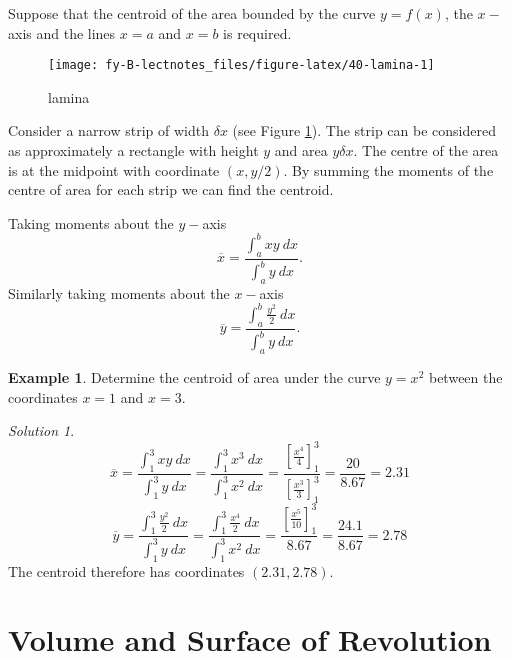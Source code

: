 \documentclass[
  11pt,
  oneside]{book}
\newcommand{\slide}{}
\theoremstyle{definition}
\theoremstyle{definition}
\newtheorem{example}{Example}[chapter]
\theoremstyle{definition}
\theoremstyle{definition}
\theoremstyle{remark}
\newtheorem*{solution}{Solution}
\begin{document}
\slide

Suppose that the centroid of the area bounded by the curve \(y=f(x)\), the \(x-\)axis and the lines \(x=a\) and \(x=b\) is required.

\begin{figure}

{\centering \texttt{[image: fy-B-lectnotes\_files/figure-latex/40-lamina-1]} 

}

\caption{lamina}\label{fig:40-lamina}
\end{figure}

Consider a narrow strip of width \(\delta x\) (see Figure \ref{fig:40-lamina}). The strip can be considered as approximately a rectangle with height \(y\) and area \(y\delta x\). The centre of the area is at the midpoint with coordinate \((x,y/2)\). By summing the moments of the centre of area for each strip we can find the centroid.

\slide

Taking moments about the \(y-\)axis
\[
\overline x = \frac{\displaystyle\int_a^bxy\ dx}{\displaystyle\int_a^b y\ dx}.
\]
Similarly taking moments about the \(x-\)axis
\[
\overline y = \frac{\displaystyle\int_a^b \frac{y^2}2\ dx}{\displaystyle\int_a^b y\ dx}.
\]
\slide

\begin{example}
Determine the centroid of area under the curve \(y=x^2\) between the coordinates \(x=1\) and \(x=3\).
\end{example}

\begin{solution}
\[
\overline x = \frac{\displaystyle\int_1^3xy\ dx}{\displaystyle\int_1^3 y\ dx} = \frac{\displaystyle\int_1^3x^3\ dx}{\displaystyle\int_1^3x^2\ dx} = \frac{\left[\frac{x^4}{4}\right]_1^3}{\left[\frac{x^3}{3}\right]_1^3} = \frac{20}{8.67} = 2.31
\]
\[
\overline y = \frac{\displaystyle\int_1^3\frac{y^2}2\ dx}{\displaystyle\int_1^3 y\ dx} = \frac{\displaystyle\int_1^3\frac{x^4}2\ dx}{\displaystyle\int_1^3x^2\ dx} = \frac{\left[\frac{x^5}{10}\right]_1^3}{8.67} = \frac{24.1}{8.67} = 2.78
\]
The centroid therefore has coordinates \((2.31,2.78)\).
\end{solution}

\slide

\section{Volume and Surface of Revolution}\label{volume-and-surface-of-revolution}
\end{document}
